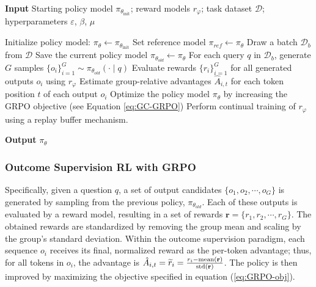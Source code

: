 \begin{itemize}[topsep=0pt]
\begin{itemize}[topsep=0pt]
\begin{algorithm}[t]
  \small
  \caption{Iterative Group Relative Policy Optimization}
  \textbf{Input} Starting policy model $\pi_{\theta_{\text{init}}}$; reward models $r_\varphi$; task dataset $\mathcal{D}$; 
  hyperparameters $\varepsilon$, $\beta$, $\mu$
  \begin{algorithmic}[1]
    \State Initialize policy model: $\pi_\theta \leftarrow \pi_{\theta_{\text{init}}}$
       \State Set reference model $\pi_{ref} \leftarrow \pi_{\theta}$
      \State Draw a batch $\mathcal{D}_b$ from $\mathcal{D}$
      \State Save the current policy model $\pi_{\theta_{old}} \leftarrow \pi_{\theta}$ 
      \State For each query $q$ in $\mathcal{D}_b$, generate $G$ samples $\{o_i\}_{i=1}^G \sim \pi_{\theta_{old}} (\cdot \mid q)$
      \State Evaluate rewards $\{r_i\}_{i=1}^{G}$ for all generated outputs $o_i$ using $r_{\varphi}$
      \State Estimate group-relative advantages $\hat{A}_{i,t}$ for each token position $t$ of each output $o_i$
        \State Optimize the policy model $\pi_{\theta}$ by increasing the GRPO objective (see Equation \ref{eq:GC-GRPO})
      \EndFor
    \EndFor
    \State Perform continual training of $r_\varphi$ using a replay buffer mechanism.
    \EndFor
  \end{algorithmic}
  \textbf{Output} $\pi_\theta$
  \label{alg:iter-grpo}
\end{algorithm}

\subsubsection{Outcome Supervision RL with GRPO} Specifically, given a question $q$, a set of output candidates $\{o_1, o_2, \cdots, o_G\}$ is generated by sampling from the previous policy, $\pi_{\theta_{old}}$. Each of these outputs is evaluated by a reward model, resulting in a set of rewards $\mathbf{r}=\{r_1, r_2, \cdots, r_G\}$. The obtained rewards are standardized by removing the group mean and scaling by the group's standard deviation. Within the outcome supervision paradigm, each sequence $o_i$ receives its final, normalized reward as the per-token advantage; thus, for all tokens in $o_i$, the advantage is $\hat{A}_{i, t} = \widetilde{r}_i = \frac{r_i- {\rm mean}(\mathbf{r})}{{\rm std}(\mathbf{r})}$. The policy is then improved by maximizing the objective specified in equation (\ref{eq:GRPO-obj}).


\end{itemize}
\end{itemize}
